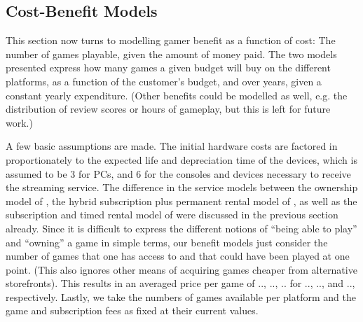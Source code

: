 %




\subsection{Cost-Benefit Models}\label{subsec:cost-benefit-models}

This section now turns to modelling gamer benefit as a function of cost: The number of games playable, given the amount of money paid. The two models presented express how many games a given budget will buy on the different platforms, as a function of the customer's budget, and over years, given a constant yearly expenditure. (Other benefits could be modelled as well, e.g. the distribution of review scores or hours of gameplay, but this is left for future work.)

A few basic assumptions are made. The initial hardware costs are factored in proportionately to the expected life and depreciation time of the devices, which is assumed to be \SI{3}{\year} for PCs, and \SI{6}{\year} for the consoles and devices necessary to receive the streaming service. %
The difference in the service models between the ownership model of \steam, the hybrid subscription plus permanent rental model of \gfnow, as well as the subscription and timed rental model of \psnow were discussed in the previous section already. Since it is difficult to express the different notions of ``being able to play'' and ``owning'' a game in simple terms, our benefit models just consider the number of games that one has access to and that could have been played at one point. (This also ignores other means of acquiring games cheaper from alternative storefronts). This results in an averaged price per game of .., .., .. for .., .., and .., respectively. Lastly, we take the numbers of games available per platform and the game and subscription fees as fixed at their current values.

